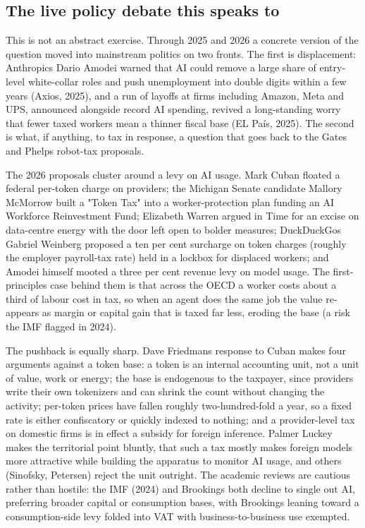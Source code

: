 \documentclass[11pt]{article}
\begin{document}
\hypertarget{the-live-policy-debate-this-speaks-to}{%
\subsection{The live policy debate this speaks
to}\label{the-live-policy-debate-this-speaks-to}}

This is not an abstract exercise. Through 2025 and 2026 a concrete
version of the question moved into mainstream politics on two fronts.
The first is displacement: Anthropic\textquotesingle s Dario Amodei
warned that AI could remove a large share of entry-level white-collar
roles and push unemployment into double digits within a few years
(Axios, 2025), and a run of layoffs at firms including Amazon, Meta and
UPS, announced alongside record AI spending, revived a long-standing
worry that fewer taxed workers mean a thinner fiscal base (EL País,
2025). The second is what, if anything, to tax in response, a question
that goes back to the Gates and Phelps robot-tax proposals.

The 2026 proposals cluster around a levy on AI usage. Mark Cuban floated
a federal per-token charge on providers; the Michigan Senate candidate
Mallory McMorrow built a "Token Tax" into a worker-protection plan
funding an AI Workforce Reinvestment Fund; Elizabeth Warren argued in
Time for an excise on data-centre energy with the door left open to
bolder measures; DuckDuckGo\textquotesingle s Gabriel Weinberg proposed
a ten per cent surcharge on token charges (roughly the employer
payroll-tax rate) held in a lockbox for displaced workers; and Amodei
himself mooted a three per cent revenue levy on model usage. The
first-principles case behind them is that across the OECD a worker costs
about a third of labour cost in tax, so when an agent does the same job
the value re-appears as margin or capital gain that is taxed far less,
eroding the base (a risk the IMF flagged in 2024).

The pushback is equally sharp. Dave Friedman\textquotesingle s response
to Cuban makes four arguments against a token base: a token is an
internal accounting unit, not a unit of value, work or energy; the base
is endogenous to the taxpayer, since providers write their own
tokenizers and can shrink the count without changing the activity;
per-token prices have fallen roughly two-hundred-fold a year, so a fixed
rate is either confiscatory or quickly indexed to nothing; and a
provider-level tax on domestic firms is in effect a subsidy for foreign
inference. Palmer Luckey makes the territorial point bluntly, that such
a tax mostly makes foreign models more attractive while building the
apparatus to monitor AI usage, and others (Sinofsky, Petersen) reject
the unit outright. The academic reviews are cautious rather than
hostile: the IMF (2024) and Brookings both decline to single out AI,
preferring broader capital or consumption bases, with Brookings leaning
toward a consumption-side levy folded into VAT with business-to-business
use exempted.
\end{document}
